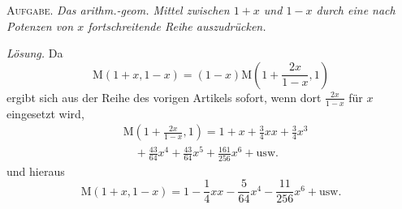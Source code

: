 
\textsc{Aufgabe.} \textit{Das arithm.-geom. Mittel zwischen \(1+x\) und \(1-x\) durch eine nach Potenzen von \(x\) fortschreitende Reihe auszudrücken.}

\textit{Lösung.} Da
\[
\mathrm{M}(1+x,1-x)=(1-x)\mathrm{M}(1+\frac{2x}{1-x},1)
\]
ergibt sich aus der Reihe des vorigen Artikels sofort, wenn dort \(\frac{2x}{1-x}\) für \(x\) eingesetzt wird,
\[
\begin{aligned}&\mathrm{M}(1+\frac{2x}{1-x},1)=1+x+\frac34xx+\frac34x^3\\&\quad+\frac{43}{64}x^4+\frac{43}{64}x^5+\frac{161}{256}x^6+\text{usw.}\end{aligned}
\]
und hieraus
\[
\mathrm{M}(1+x,1-x)=1-\frac14xx-\frac5{64}x^4-\frac{11}{256}x^6+\text{usw.}
\]

